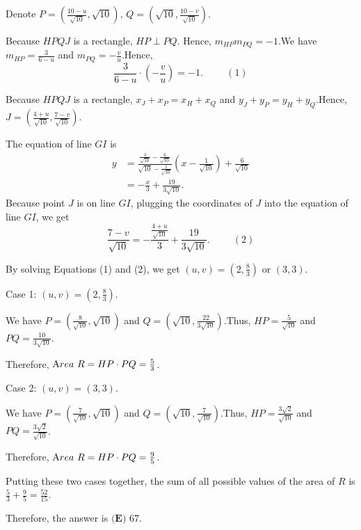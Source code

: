 \begin{enumerate}
 Denote $P = \left( \frac{10 - u}{\sqrt{10}} , \sqrt{10} \right)$, $Q = \left( \sqrt{10} , \frac{10 - v}{\sqrt{10}} \right)$.

 Because $HPQJ$ is a rectangle, $HP \perp PQ$. Hence, $m_{HP} m_{PQ} = -1$.We have $m_{HP} = \frac{3}{6 - u}$ and $m_{PQ} = - \frac{v}{u}$.Hence,
 \[ \frac{3}{6 - u} \cdot \left( - \frac{v}{u} \right) = - 1 . \hspace{1cm} (1) \]

 Because $HPQJ$ is a rectangle, $x_J + x_P = x_H + x_Q$ and $y_J + y_P = y_H + y_Q$.Hence, $J = \left( \frac{4 + u}{\sqrt{10}} , \frac{7 - v}{\sqrt{10}} \right)$.

 The equation of line $GI$ is
 \begin{align*} y & = \frac{\frac{3}{\sqrt{10}} - \frac{6}{\sqrt{10}}}{\sqrt{10} - \frac{1}{\sqrt{10}}} \left( x - \frac{1}{\sqrt{10}} \right) + \frac{6}{\sqrt{10}} \\ & = - \frac{x}{3} + \frac{19}{3 \sqrt{10}} . \end{align*}
Because point $J$ is on line $GI$, plugging the coordinates of $J$ into the equation of line $GI$, we get
 \[ \frac{7 - v}{\sqrt{10}} = - \frac{\frac{4 + u}{\sqrt{10}}}{3} + \frac{19}{3 \sqrt{10}} . \hspace{1cm} (2) \]

 By solving Equations (1) and (2), we get $\left( u , v \right) = \left( 2 , \frac{8}{3} \right)$ or $\left( 3 , 3 \right)$.

 Case 1: $\left( u , v \right) = \left( 2 , \frac{8}{3} \right)$.

 We have $P = \left( \frac{8}{\sqrt{10}} , \sqrt{10} \right)$ and $Q = \left( \sqrt{10} , \frac{22}{3 \sqrt{10}} \right)$.Thus, $HP = \frac{5}{\sqrt{10}}$ and $PQ = \frac{10}{3\sqrt{10}}$.

 Therefore, ${\textrm Area} \ R = HP \cdot PQ = \frac{5}{3}$.

 Case 2: $\left( u , v \right) = \left( 3 , 3 \right)$.

 We have $P = \left( \frac{7}{\sqrt{10}} , \sqrt{10} \right)$ and $Q = \left( \sqrt{10} , \frac{7}{ \sqrt{10}} \right)$.Thus, $HP = \frac{3 \sqrt{2}}{\sqrt{10}}$ and $PQ = \frac{3 \sqrt{2}}{\sqrt{10}}$.

 Therefore, ${\textrm Area} \ R = HP \cdot PQ = \frac{9}{5}$.

 Putting these two cases together, the sum of all possible values of the area of $R$ is $\frac{5}{3} + \frac{9}{5} = \frac{52}{15}$.

 
Therefore, the answer is $\boxed{\textbf{(E) }67}$.


\end{enumerate}
